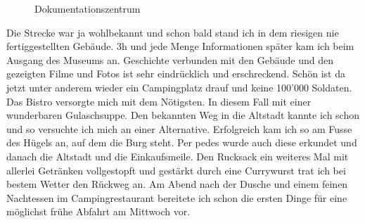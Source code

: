 \begin{figure}[H]
   \centering
   \quad
   \quad
   \caption[Dokumentationszentrum]{Dokumentationszentrum}
\end{figure}

Die Strecke war ja wohlbekannt und schon bald stand ich in dem riesigen nie fertiggestellten Gebäude.
3h und jede Menge Informationen später kam ich beim Ausgang des Museums an.
Geschichte verbunden mit den Gebäude und den gezeigten Filme und Fotos ist sehr eindrücklich und erschreckend.
Schön ist da jetzt unter anderem wieder ein Campingplatz drauf und keine 100'000 Soldaten.
Das Bistro versorgte mich mit dem Nötigsten.
In diesem Fall mit einer wunderbaren Gulaschsuppe.
Den bekannten Weg in die Altstadt kannte ich schon und so versuchte ich mich an einer Alternative.
Erfolgreich kam ich so am Fusse des Hügels an, auf dem die Burg steht.
Per pedes wurde auch diese erkundet und danach die Altstadt und die Einkaufsmeile.
Den Rucksack ein weiteres Mal mit allerlei Getränken vollgestopft und gestärkt durch eine Currywurst trat ich bei bestem Wetter den Rückweg an.
Am Abend nach der Dusche und einem feinen Nachtessen im Campingrestaurant bereitete ich schon die ersten Dinge für eine möglichst frühe Abfahrt am Mittwoch vor.

